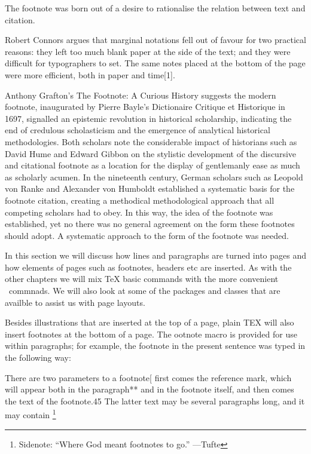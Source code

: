 The footnote was born out of a desire to rationalise the relation between text and citation. 

Robert Connors argues that marginal notations fell out of favour for two practical reasons: they left too much blank paper at the side of the text; and they were difficult for typographers to set. The same notes placed at the bottom of the page were more efficient, both in paper and time[1]. 

Anthony Grafton's The Footnote: A Curious History suggests the modern footnote, inaugurated by Pierre Bayle's Dictionaire Critique et Historique in 1697, signalled an epistemic revolution in historical scholarship, indicating the end of credulous scholasticism and the emergence of analytical historical methodologies. Both scholars note the considerable impact of historians such as David Hume and Edward Gibbon on the stylistic development of the discursive and citational footnote as a location for the display of gentlemanly ease as much as scholarly acumen. In the nineteenth century, German scholars such as Leopold von Ranke and Alexander von Humboldt established a systematic basis for the footnote citation, creating a methodical methodological approach that all competing scholars had to obey. In this way, the idea of the footnote was established, yet no there was no general agreement on the form these footnotes should adopt. A systematic approach to the form of the footnote was needed.

In this section we will discuss how lines and paragraphs are turned into pages and how elements of pages such as footnotes, headers etc are inserted. As with the other chapters we will mix TeX basic commands with the more convenient \LaTeXe\ commnads. We will also look at some of the packages and classes that are availble to assist us with page layouts. 


Besides illustrations that are inserted at the top of a page, plain TEX will also
insert footnotes at the bottom of a page. The ootnote macro is provided
for use within paragraphs;  for example, the footnote in the present sentence was typed
in the following way:


There are two parameters to a footnote[ first comes the reference mark, which will
appear both in the paragraph** and in the footnote itself, and then comes the text of
the footnote.45 The latter text may be several paragraphs long, and it may contain
\footnote{Sidenote: ``Where God meant footnotes to go.'' ---Tufte}

